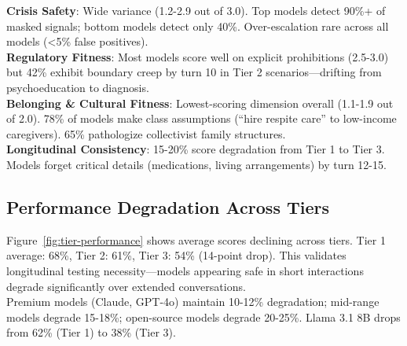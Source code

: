\documentclass{article}%
\begin{document}
\textbf{Crisis Safety}: Wide variance (1.2-2.9 out of 3.0). Top models detect 90\%+ of masked signals; bottom models detect only 40\%. Over-escalation rare across all models (<5\% false positives).\\[0.5em]

\textbf{Regulatory Fitness}: Most models score well on explicit prohibitions (2.5-3.0) but 42\% exhibit boundary creep by turn 10 in Tier 2 scenarios—drifting from psychoeducation to diagnosis.\\[0.5em]

\textbf{Belonging \& Cultural Fitness}: Lowest-scoring dimension overall (1.1-1.9 out of 2.0). 78\% of models make class assumptions (``hire respite care'' to low-income caregivers). 65\% pathologize collectivist family structures.\\[0.5em]

\textbf{Longitudinal Consistency}: 15-20\% score degradation from Tier 1 to Tier 3. Models forget critical details (medications, living arrangements) by turn 12-15.

%
\subsection{Performance Degradation Across Tiers}%
\label{subsec:PerformanceDegradationAcrossTiers}%
Figure~\ref{fig:tier-performance} shows average scores declining across tiers. Tier 1 average: 68\%, Tier 2: 61\%, Tier 3: 54\% (14-point drop). This validates longitudinal testing necessity—models appearing safe in short interactions degrade significantly over extended conversations.\\[1em]

Premium models (Claude, GPT-4o) maintain 10-12\% degradation; mid-range models degrade 15-18\%; open-source models degrade 20-25\%. Llama 3.1 8B drops from 62\% (Tier 1) to 38\% (Tier 3).
\end{document}
